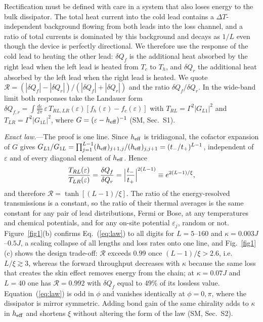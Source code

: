 \documentclass[reprint,aps,prl,superscriptaddress,nofootinbib,floatfix]{revtex4-2}
\newcommand{\R}{\mathcal{R}}
\newcommand{\dQ}{\delta Q}
\newcommand{\heff}{h_{\rm eff}}
\begin{document}
Rectification must be defined with care in a system that also loses energy to the bulk dissipator.
The total heat current into the cold lead contains a $\Delta T$-independent background flowing from both leads into the loss channel, and a ratio of total currents is dominated by this background and decays as $1/L$ even though the device is perfectly directional.
We therefore use the response of the cold lead to heating the other lead:
$\dQ_f$ is the additional heat absorbed by the right lead when the left lead is heated from $T_c$ to $T_h$, and $\dQ_r$ the additional heat absorbed by the left lead when the right lead is heated. We quote $\R=(|\dQ_f|-|\dQ_r|)/(|\dQ_f|+|\dQ_r|)$ and the ratio $\dQ_f/\dQ_r$. In the wide-band limit both responses take the Landauer form $\dQ_{f,r}=\int\frac{d\varepsilon}{2\pi}\,\varepsilon\,T_{RL,LR}(\varepsilon)[f_h(\varepsilon)-f_c(\varepsilon)]$ with $T_{RL}=\Gamma^2|G_{L1}|^2$ and $T_{LR}=\Gamma^2|G_{1L}|^2$, where $G=(\varepsilon-\heff)^{-1}$ (SM, Sec.~S1).

\textit{Exact law.}---The proof is one line. Since $\heff$ is tridiagonal, the cofactor expansion of $G$ gives $G_{L1}/G_{1L}=\prod_{j=1}^{L-1}(\heff)_{j+1,j}/(\heff)_{j,j+1}=(t_-/t_+)^{L-1}$, independent of $\varepsilon$ and of every diagonal element of $\heff$. Hence
\begin{equation}
\frac{T_{RL}(\varepsilon)}{T_{LR}(\varepsilon)}=\frac{\dQ_f}{\dQ_r}=\Bigl|\frac{t_-}{t_+}\Bigr|^{2(L-1)}\equiv e^{2(L-1)/\xi},
\label{eq:law}
\end{equation}
and therefore $\R=\tanh[(L-1)/\xi]$. The ratio of the energy-resolved transmissions is a constant, so the ratio of their thermal averages is the same constant for any pair of lead distributions, Fermi or Bose, at any temperatures and chemical potentials, and for any on-site potential $\varepsilon_j$, random or not.
Figure~\ref{fig1}(b) confirms Eq.~(\ref{eq:law}) to all digits for $L=5$--$160$ and $\kappa=0.003J$--$0.5J$, a scaling collapse of all lengths and loss rates onto one line, and Fig.~\ref{fig1}(c) shows the design trade-off: $\R$ exceeds $0.99$ once $(L-1)/\xi>2.6$, i.e.\ $L/\xi\gtrsim3$, whereas the forward throughput decreases with $\kappa$ because the same loss that creates the skin effect removes energy from the chain; at $\kappa=0.07J$ and $L=40$ one has $\R=0.992$ with $\dQ_f$ equal to $49\%$ of its lossless value.
Equation~(\ref{eq:law}) is odd in $\phi$ and vanishes identically at $\phi=0,\pi$, where the dissipator is mirror symmetric. Adding bond gain of the same chirality adds to $\kappa$ in $\heff$ and shortens $\xi$ without altering the form of the law (SM, Sec.~S2).
\end{document}
